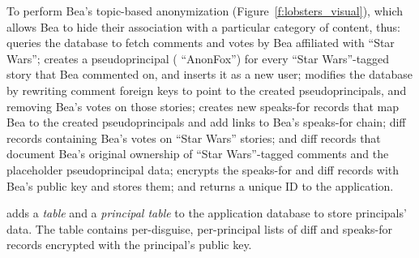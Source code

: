 %
To perform Bea's topic-based anonymization (Figure~\ref{f:lobsters_visual}),
which allows Bea to hide their association with a particular category of
content,
%
\sys thus:
%
\one{} queries the database to fetch comments and votes by Bea
affiliated with ``Star Wars'';
%
\two{} creates a pseudoprincipal (\eg
``AnonFox'') for every ``Star Wars''-tagged story that Bea commented
on, and inserts it as a new user;
%
\three{} modifies the database by rewriting comment
foreign keys to point to the created pseudoprincipals, and
removing Bea's votes on those stories;
%
\four{} creates new speaks-for records that map Bea to the created
pseudoprincipals and add links to Bea's speaks-for chain; diff records
containing Bea's votes on ``Star Wars'' stories; and diff records that document
Bea's original ownership of ``Star Wars''-tagged comments and the placeholder
pseudoprincipal data;
%
\five{} encrypts the speaks-for and diff records with Bea's public key and stores
them; and
%
\six{} returns a unique \xx ID to the application.

%
%
%

\sys adds a \emph{\xx table} and a \emph{principal table} to the application
database to store principals' \xxed data.
%
The \xx table contains per-disguise, per-principal lists of diff and speaks-for
records encrypted with the principal's public key.
%
%

